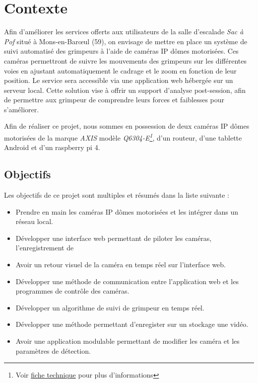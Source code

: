 \documentclass[a4paper, 11pt, french]{article}
\newcounter{obj}
\begin{document}

\setcounter{secnumdepth}{3}
\setcounter{tocdepth}{3}
\startcontents[sections]

\tableofcontents
\newpage


\section{Contexte}
Afin d'améliorer les services offerts aux utilisateurs de la salle d’escalade \textit{Sac à Pof} situé à  Mons-en-Barœul (59), on envisage de mettre en place un système de suivi automatisé des grimpeurs à l'aide de caméras IP dômes motorisées. Ces caméras permettront de suivre les mouvements des grimpeurs sur les différentes voies en ajustant automatiquement le cadrage et le zoom en fonction de leur position. Le service sera accessible via une application web hébergée sur un serveur local. Cette solution vise à offrir un support d'analyse post-session, afin de permettre aux grimpeur de comprendre leurs forces et faiblesses pour s'améliorer.

Afin de réaliser ce projet, nous sommes en possession de deux caméras IP dômes motorisées de la marque \textit{AXIS} modèle \textit{Q6304-E\footnote{Voir \href{https://www.axis.com/dam/public/11/e4/20/cam\%C3\%A9ra-r\%C3\%A9seau-\%C3\%A0-d\%C3\%B4me-ptz-axis-q6034-e-fr-FR-201515.pdf}{fiche technique} pour plus d'informations}}, d'un routeur, d'une tablette Android et d'un raspberry pi 4.

\subsection{Objectifs}
Les objectifs de ce projet sont multiples et  résumés dans la liste suivante :
\begin{itemize}
  \item Prendre en main les caméras IP dômes motorisées et les intégrer dans un réseau local.
  \item Développer une interface web permettant de piloter les caméras, l'enregistrement de  \item Avoir un retour visuel de la caméra en temps réel sur l'interface web.
  \item Développer une méthode de communication entre l'application web et les programmes de contrôle des caméras.
  \item Développer un algorithme de suivi de grimpeur en temps réel.
  \item Développer une méthode permettant d'enregister sur un stockage une vidéo.
  \item Avoir une application modulable permettant de modifier les caméra et les paramètres de détection.
\end{itemize}
\end{document}
